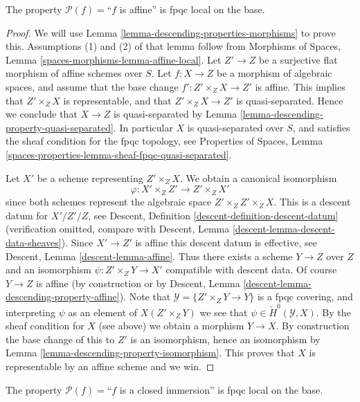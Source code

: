 \begin{lemma}
\label{lemma-descending-property-affine}
The property $\mathcal{P}(f) =$``$f$ is affine''
is fpqc local on the base.
\end{lemma}

\begin{proof}
We will use
Lemma \ref{lemma-descending-properties-morphisms}
to prove this. Assumptions (1) and (2) of that lemma follow from
Morphisms of Spaces,
Lemma \ref{spaces-morphisms-lemma-affine-local}.
Let $Z' \to Z$ be a surjective flat morphism of affine schemes over $S$.
Let $f : X \to Z$ be a morphism of algebraic spaces, and assume
that the base change $f' : Z' \times_Z X \to Z'$ is affine.
This implies that $Z' \times_Z X$ is representable, and
that $Z' \times_Z X \to Z'$ is quasi-separated. Hence we conclude
that $X \to Z$ is quasi-separated by
Lemma \ref{lemma-descending-property-quasi-separated}.
In particular $X$ is quasi-separated over $S$, and satisfies the
sheaf condition for the fpqc topology, see
Properties of Spaces,
Lemma \ref{spaces-properties-lemma-sheaf-fpqc-quasi-separated}.

\medskip\noindent
Let $X'$ be a scheme representing $Z' \times_Z X$.
We obtain a canonical isomorphism
$$
\varphi : X' \times_Z Z' \longrightarrow Z' \times_Z X'
$$
since both schemes represent the algebraic space $Z' \times_Z Z' \times_Z X$.
This is a descent datum for $X'/Z'/Z$, see
Descent, Definition \ref{descent-definition-descent-datum}
(verification omitted, compare with
Descent, Lemma \ref{descent-lemma-descent-data-sheaves}).
Since $X' \to Z'$ is affine this descent datum is effective, see
Descent, Lemma \ref{descent-lemma-affine}.
Thus there exists a scheme $Y \to Z$ over $Z$ and an
isomorphism $\psi : Z' \times_Z Y \to X'$ compatible with descent data.
Of course $Y \to Z$ is affine (by construction or by
Descent, Lemma \ref{descent-lemma-descending-property-affine}).
Note that $\mathcal{Y} = \{Z' \times_Z Y \to Y\}$ is a
fpqc covering, and interpreting $\psi$ as an element of
$X(Z' \times_Z Y)$ we see that $\psi \in \check{H}^0(\mathcal{Y}, X)$.
By the sheaf condition for $X$ (see above) we obtain a morphism $Y \to X$.
By construction the base change of this to $Z'$ is an isomorphism, hence
an isomorphism by
Lemma \ref{lemma-descending-property-isomorphism}.
This proves that $X$ is representable by an affine scheme and we win.
\end{proof}

\begin{lemma}
\label{lemma-descending-property-closed-immersion}
The property $\mathcal{P}(f) =$``$f$ is a closed immersion''
is fpqc local on the base.
\end{lemma}

